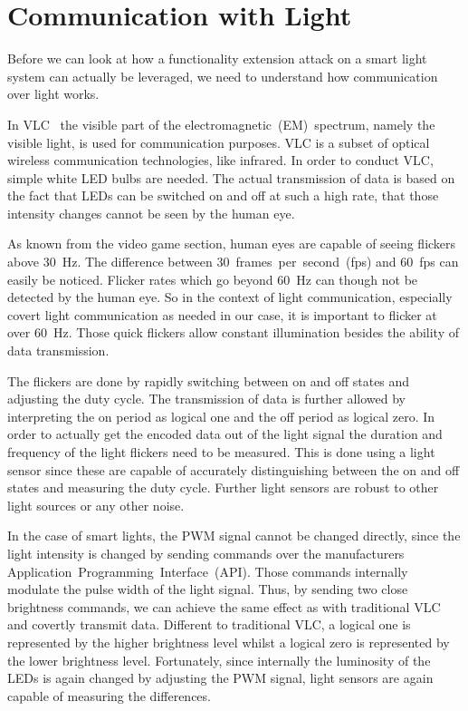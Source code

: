 \section{Communication with Light} %
\label{sec:light_communication}

Before we can look at how a functionality extension attack on a smart light system can actually be leveraged, we need to understand how communication over light works.


In VLC~\cite{Komine:2004:FAfVLCSuLL, Yu:2014:BCDRCVLOS} the visible part of the electromagnetic~(EM)~spectrum, namely the visible light, is used for communication purposes. VLC is a subset of optical wireless communication technologies, like infrared.
In order to conduct VLC, simple white LED bulbs are needed. The actual transmission of data is based on the fact that LEDs can be switched on and off at such a high rate, that those intensity changes cannot be seen by the human eye.

As known from the video game section, human eyes are capable of seeing flickers above 30~Hz. The difference between 30~frames~per~second~(fps) and 60~fps can easily be noticed. Flicker rates which go beyond 60~Hz can though not be detected by the human eye. So in the context of light communication, especially covert light communication as needed in our case, it is important to flicker at over 60~Hz. Those quick flickers allow constant illumination besides the ability of data transmission.

The flickers are done by rapidly switching between on and off states and adjusting the duty cycle. The transmission of data is further allowed by interpreting the on period as logical one and the off period as logical zero. In order to actually get the encoded data out of the light signal the duration and frequency of the light flickers need to be measured. This is done using a light sensor since these are capable of accurately distinguishing between the on and off states and measuring the duty cycle. Further light sensors are robust to other light sources or any other noise.

In the case of smart lights, the PWM signal cannot be changed directly, since the light intensity is changed by sending commands over the manufacturers Application~Programming~Interface~(API). Those commands internally modulate the pulse width of the light signal. Thus, by sending two close brightness commands, we can achieve the same effect as with traditional VLC and covertly transmit data. Different to traditional VLC, a logical one is represented by the higher brightness level whilst a logical zero is represented by the lower brightness level. Fortunately, since internally the luminosity of the LEDs is again changed by adjusting the PWM signal, light sensors are again capable of measuring the differences. 
